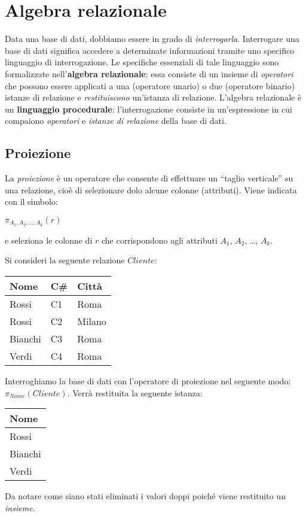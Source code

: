 \section{Algebra relazionale}
Data una base di dati, dobbiamo essere in grado di \emph{interrogarla}. Interrogare una
base di dati significa accedere a determinate informazioni tramite uno specifico linguaggio
di interrogazione. Le specifiche essenziali di tale linguaggio sono formalizzate 
nell'\textbf{algebra relazionale}; essa consiste di un insieme di \emph{operatori} che 
possono essere applicati a una (operatore unario) o due (operatore binario) istanze di 
relazione e \emph{restituiscono} un'istanza di relazione. L'algebra relazionale è un 
\textbf{linguaggio procedurale}: l'interrogazione consiste in un'espressione in
cui compaiono \emph{operatori} e \emph{istanze di relazione} della base di dati.

\subsection{Proiezione}
La \emph{proiezione} è un operatore che consente di effettuare un ``taglio verticale''
su una relazione, cioè di selezionare dolo alcune colonne (attributi). Viene indicata
con il simbolo:
\begin{center}
\begin{math}
 \pi_{A_1, A_2, \ldots, A_k}(r)
\end{math}
\end{center}
e seleziona le colonne di $r$ che corrispondono agli attributi $A_1$, $A_2$, \ldots, $A_k$.

\begin{exmp}
Si consideri la seguente relazione $Cliente$:
\begin{center}
\begin{tabular}{l |l | l}
  Nome & C\# & Città\\
  \hline
  Rossi & C1 & Roma\\
  Rossi & C2 & Milano\\
  Bianchi & C3 & Roma\\
  Verdi & C4 & Roma\\
\end{tabular}
\end{center}
Interroghiamo la base di dati con l'operatore di proiezione nel seguente modo: $\pi_{Nome}(Cliente)$.
Verrà restituita la seguente istanza:
\begin{center}
\begin{tabular}{l}
  Nome \\
  \hline
  Rossi \\
  Bianchi\\
  Verdi\\
\end{tabular}
\end{center}
Da notare come siano stati eliminati i valori doppi poiché viene restituito un \emph{insieme}.
\end{exmp}

